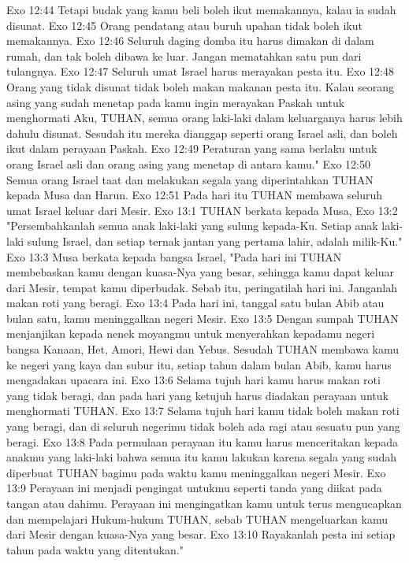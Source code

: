Exo 12:44  Tetapi budak yang kamu beli boleh ikut memakannya, kalau ia sudah disunat.
Exo 12:45  Orang pendatang atau buruh upahan tidak boleh ikut memakannya.
Exo 12:46  Seluruh daging domba itu harus dimakan di dalam rumah, dan tak boleh dibawa ke luar. Jangan mematahkan satu pun dari tulangnya.
Exo 12:47  Seluruh umat Israel harus merayakan pesta itu.
Exo 12:48  Orang yang tidak disunat tidak boleh makan makanan pesta itu. Kalau seorang asing yang sudah menetap pada kamu ingin merayakan Paskah untuk menghormati Aku, TUHAN, semua orang laki-laki dalam keluarganya harus lebih dahulu disunat. Sesudah itu mereka dianggap seperti orang Israel asli, dan boleh ikut dalam perayaan Paskah.
Exo 12:49  Peraturan yang sama berlaku untuk orang Israel asli dan orang asing yang menetap di antara kamu."
Exo 12:50  Semua orang Israel taat dan melakukan segala yang diperintahkan TUHAN kepada Musa dan Harun.
Exo 12:51  Pada hari itu TUHAN membawa seluruh umat Israel keluar dari Mesir.
Exo 13:1  TUHAN berkata kepada Musa,
Exo 13:2  "Persembahkanlah semua anak laki-laki yang sulung kepada-Ku. Setiap anak laki-laki sulung Israel, dan setiap ternak jantan yang pertama lahir, adalah milik-Ku."
Exo 13:3  Musa berkata kepada bangsa Israel, "Pada hari ini TUHAN membebaskan kamu dengan kuasa-Nya yang besar, sehingga kamu dapat keluar dari Mesir, tempat kamu diperbudak. Sebab itu, peringatilah hari ini. Janganlah makan roti yang beragi.
Exo 13:4  Pada hari ini, tanggal satu bulan Abib atau bulan satu, kamu meninggalkan negeri Mesir.
Exo 13:5  Dengan sumpah TUHAN menjanjikan kepada nenek moyangmu untuk menyerahkan kepadamu negeri bangsa Kanaan, Het, Amori, Hewi dan Yebus. Sesudah TUHAN membawa kamu ke negeri yang kaya dan subur itu, setiap tahun dalam bulan Abib, kamu harus mengadakan upacara ini.
Exo 13:6  Selama tujuh hari kamu harus makan roti yang tidak beragi, dan pada hari yang ketujuh harus diadakan perayaan untuk menghormati TUHAN.
Exo 13:7  Selama tujuh hari kamu tidak boleh makan roti yang beragi, dan di seluruh negerimu tidak boleh ada ragi atau sesuatu pun yang beragi.
Exo 13:8  Pada permulaan perayaan itu kamu harus menceritakan kepada anakmu yang laki-laki bahwa semua itu kamu lakukan karena segala yang sudah diperbuat TUHAN bagimu pada waktu kamu meninggalkan negeri Mesir.
Exo 13:9  Perayaan ini menjadi pengingat untukmu seperti tanda yang diikat pada tangan atau dahimu. Perayaan ini mengingatkan kamu untuk terus mengucapkan dan mempelajari Hukum-hukum TUHAN, sebab TUHAN mengeluarkan kamu dari Mesir dengan kuasa-Nya yang besar.
Exo 13:10  Rayakanlah pesta ini setiap tahun pada waktu yang ditentukan."
